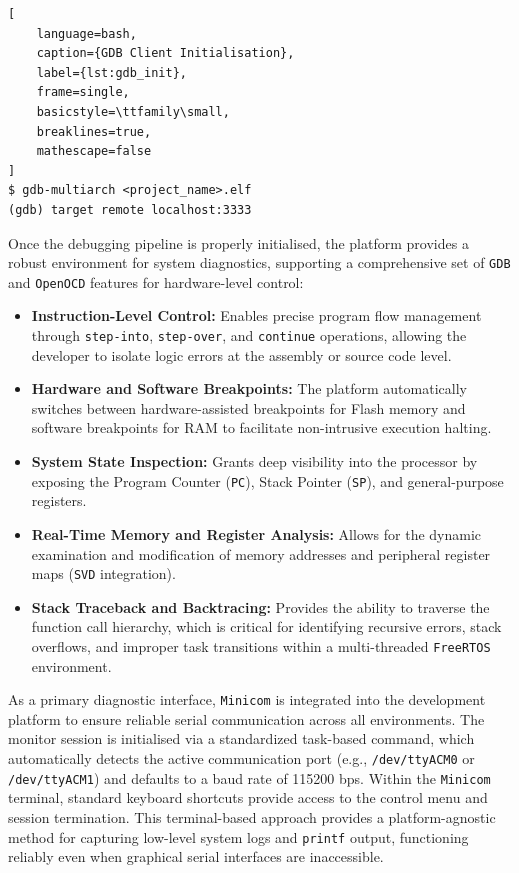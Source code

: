 \begin{lstlisting}[
    language=bash,
    caption={GDB Client Initialisation},
    label={lst:gdb_init},
    frame=single,
    basicstyle=\ttfamily\small,
    breaklines=true,
    mathescape=false
]
$ gdb-multiarch <project_name>.elf
(gdb) target remote localhost:3333
\end{lstlisting}
Once the debugging pipeline is properly initialised, the platform provides a robust environment for system diagnostics, supporting a comprehensive set of \texttt{GDB} and \texttt{OpenOCD} features for hardware-level control:
\begin{itemize}
\item \textbf{Instruction-Level Control:} Enables precise program flow management through \texttt{step-into}, \texttt{step-over}, and \texttt{continue} operations, allowing the developer to isolate logic errors at the assembly or source code level.
\item \textbf{Hardware and Software Breakpoints:} The platform automatically switches between hardware-assisted breakpoints for Flash memory and software breakpoints for RAM to facilitate non-intrusive execution halting.
\item \textbf{System State Inspection:} Grants deep visibility into the processor by exposing the Program Counter (\texttt{PC}), Stack Pointer (\texttt{SP}), and general-purpose registers.
\item \textbf{Real-Time Memory and Register Analysis:} Allows for the dynamic examination and modification of memory addresses and peripheral register maps (\texttt{SVD} integration).
\item \textbf{Stack Traceback and Backtracing:} Provides the ability to traverse the function call hierarchy, which is critical for identifying recursive errors, stack overflows, and improper task transitions within a multi-threaded \texttt{FreeRTOS} environment.
\end{itemize}

As a primary diagnostic interface, \texttt{Minicom} is integrated into the development platform to ensure reliable serial communication across all environments. The monitor session is initialised via a standardized task-based command, which automatically detects the active communication port (e.g., \texttt{/dev/ttyACM0} or \texttt{/dev/ttyACM1}) and defaults to a baud rate of 115200 bps. Within the \texttt{Minicom} terminal, standard keyboard shortcuts provide access to the control menu and session termination. This terminal-based approach provides a platform-agnostic method for capturing low-level system logs and \texttt{printf} output, functioning reliably even when graphical serial interfaces are inaccessible.

